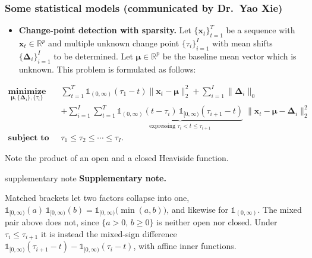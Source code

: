 \documentclass[aspectratio=169,xcolor=dvipsnames]{beamer}
\newenvironment{supplementarynote}{%
  \vspace{0.08cm}%
  \begin{beamercolorbox}[
    wd=\textwidth,sep=0.08cm,leftskip=0.08cm,rightskip=0.08cm
  ]{supplementary note}%
  \footnotesize
  \textcolor{SupplementAccent}{\textbf{Supplementary note.}}\enspace
}{%
  \end{beamercolorbox}%
}
\begin{document}
\begin{frame}
  \frametitle{Some statistical models
    {\normalsize\mdseries (communicated by Dr.~Yao Xie)}}

  \small
  \setlength{\abovedisplayskip}{4pt}
  \setlength{\belowdisplayskip}{4pt}

  \begin{itemize}
    \item \textbf{Change-point detection with sparsity.} Let
      $\{\mathbf{x}_t\}_{t=1}^{T}$ be a sequence with
      $\mathbf{x}_t\in\mathbb{R}^p$ and multiple unknown change point
      $\{\tau_i\}_{i=1}^{I}$ with mean shifts
      $\{\boldsymbol{\Delta}_i\}_{i=1}^{I}$ to be determined. Let
      $\boldsymbol{\mu}\in\mathbb{R}^p$ be the baseline mean vector which is
      unknown. This problem is formulated as follows:
  \end{itemize}

  \[
    \begin{aligned}
      \operatorname*{\textbf{minimize}}_{\boldsymbol{\mu},\{\boldsymbol{\Delta}_i\},\{\tau_i\}}\quad
      &\sum_{t=1}^{T}\mathds{1}_{(0,\infty)}(\tau_1-t)
        \bigl\|\mathbf{x}_t-\boldsymbol{\mu}\bigr\|_2^2
        +\sum_{i=1}^{I}\bigl\|\boldsymbol{\Delta}_i\bigr\|_0\\[2pt]
      &+\sum_{i=1}^{I}\sum_{t=1}^{T}
        \boxed{\underbrace{\mathds{1}_{(0,\infty)}(t-\tau_i)\,
          \mathds{1}_{[0,\infty)}(\tau_{i+1}-t)}_
          {\text{expressing }\tau_i<t\leq\tau_{i+1}}}\;
        \bigl\|\mathbf{x}_t-\boldsymbol{\mu}-\boldsymbol{\Delta}_i\bigr\|_2^2
        \\[2pt]
      \operatorname*{\textbf{subject to}}\quad
      &\tau_1\leq\tau_2\leq\cdots\leq\tau_I.
    \end{aligned}
  \]

  \textcolor{MediumRed}{Note} the product of an open and a closed Heaviside
  function.

  \begin{supplementarynote}
    Matched brackets let two factors collapse into one,
    $\mathds{1}_{[0,\infty)}(a)\,\mathds{1}_{[0,\infty)}(b)
     =\mathds{1}_{[0,\infty)}\bigl(\min(a,b)\bigr)$, and likewise for
    $\mathds{1}_{(0,\infty)}$. The mixed pair above does not, since
    $\{a>0,\,b\geq0\}$ is neither open nor closed. Under
    $\tau_i\leq\tau_{i+1}$ it is instead the mixed-sign difference
    $\mathds{1}_{[0,\infty)}(\tau_{i+1}-t)
     -\mathds{1}_{[0,\infty)}(\tau_i-t)$, with affine inner functions.
  \end{supplementarynote}
\end{frame}
\end{document}

